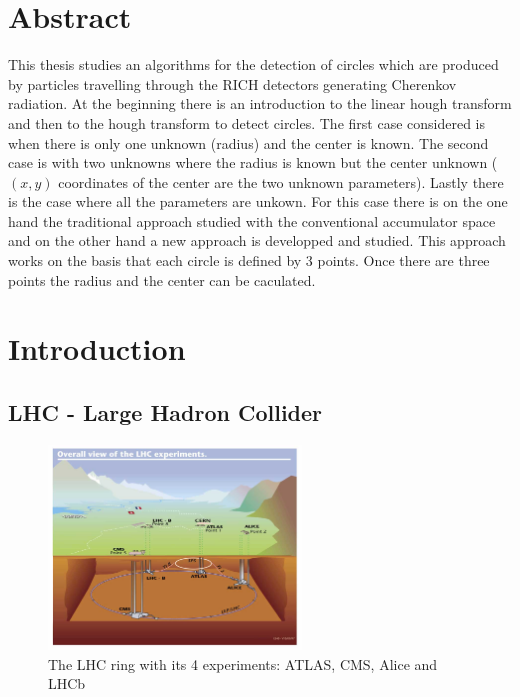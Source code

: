 \documentclass[11pt,twoside]{scrreprt}
\begin{document}
\chapter*{Abstract}
This thesis studies an algorithms for the detection of circles which are produced by particles travelling through the RICH detectors generating Cherenkov radiation.
At the beginning there is an introduction to the linear hough transform and then to the hough transform to detect circles. The first case considered
is when there is only one unknown (radius) and the center is known. The second case is with two unknowns where the radius is known but the center unknown ($(x,y)$
coordinates of the center are the two unknown parameters).
Lastly there is the case where all the parameters are unkown. For this case there is on the one hand the traditional approach studied with the conventional accumulator
space and on the other hand a new approach is developped and studied. This approach works on the basis that each circle is defined by 3 points. Once there are three
points the radius and the center can be caculated.

\tableofcontents
\listoftables
\listoffigures	

\chapter{Introduction}
\section{LHC - Large Hadron Collider} %
\label{sec:lhc_large_hadron_collider}
\begin{figure}[b]
  \centering
  \includegraphics[width=0.6\textwidth]{pics/lhc}
  \caption{The LHC ring with its 4 experiments: ATLAS, CMS, Alice and LHCb}
  \label{fig:lhc}
\end{figure}
\end{document}
